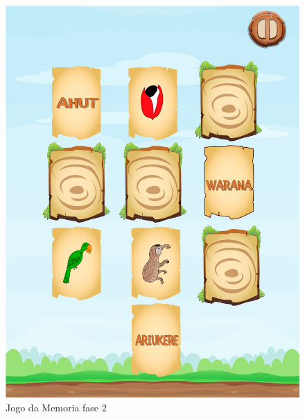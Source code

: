 \documentclass[12pt]{article}
\begin{document}
\begin{figure}[!htb]
			\includegraphics[width=\linewidth]{IMG/memoryGame.png}
			\caption{Jogo da Memoria fase 2}\label{fig:exampleFig7}
			\endminipage\hspace{0.4cm}%

\end{figure}
\end{document}
